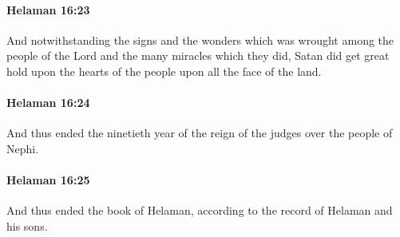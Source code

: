		\paragraph{Helaman 16:23} %
			\label{HELAMAN-16-23}

			And notwithstanding the signs and the wonders
			which was wrought among the people of the Lord
			and the many miracles which they did,
			Satan did get great hold upon the hearts of the people
			upon all the face of the land.

		\paragraph{Helaman 16:24} %
			\label{HELAMAN-16-24}

			And thus ended the ninetieth year
			of the reign of the judges over the people of Nephi.

		\paragraph{Helaman 16:25} %
			\label{HELAMAN-16-25}

			And thus ended the book of Helaman,
			according to the record of Helaman and his sons.